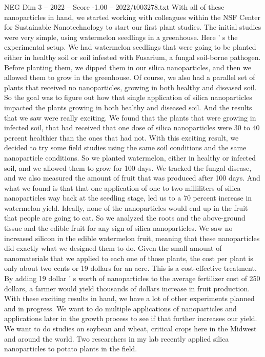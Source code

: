\begin{textsample}{NEG Dim 3 – 2022 – Score -1.00 – 2022/t003278.txt}
With all of these nanoparticles in hand, we started working with colleagues within the NSF Center for Sustainable Nanotechnology to start our first plant studies.
The initial studies were very simple, using watermelon seedlings in a greenhouse.
Here ' s the experimental setup.
We had watermelon seedlings that were going to be planted either in healthy soil or soil infested with Fusarium, a fungal soil-borne pathogen.
Before planting them, we dipped them in our silica nanoparticles, and then we allowed them to grow in the greenhouse.
Of course, we also had a parallel set of plants that received no nanoparticles, growing in both healthy and diseased soil.
So the goal was to figure out how that single application of silica nanoparticles impacted the plants growing in both healthy and diseased soil.
And the results that we saw were really exciting.
We found that the plants that were growing in infected soil, that had received that one dose of silica nanoparticles were 30 to 40 percent healthier than the ones that had not.
With this exciting result, we decided to try some field studies using the same soil conditions and the same nanoparticle conditions.
So we planted watermelon, either in healthy or infected soil, and we allowed them to grow for 100 days.
We tracked the fungal disease, and we also measured the amount of fruit that was produced after 100 days.
And what we found is that that one application of one to two milliliters of silica nanoparticles way back at the seedling stage, led us to a 70 percent increase in watermelon yield.
Ideally, none of the nanoparticles would end up in the fruit that people are going to eat.
So we analyzed the roots and the above-ground tissue and the edible fruit for any sign of silica nanoparticles.
We saw no increased silicon in the edible watermelon fruit, meaning that these nanoparticles did exactly what we designed them to do.
Given the small amount of nanomaterials that we applied to each one of those plants, the cost per plant is only about two cents or 19 dollars for an acre.
This is a cost-effective treatment.
By adding 19 dollar ' s worth of nanoparticles to the average fertilizer cost of 250 dollars, a farmer would yield thousands of dollars increase in fruit production.
With these exciting results in hand, we have a lot of other experiments planned and in progress.
We want to do multiple applications of nanoparticles and applications later in the growth process to see if that further increases our yield.
We want to do studies on soybean and wheat, critical crops here in the Midwest and around the world.
Two researchers in my lab recently applied silica nanoparticles to potato plants in the field.

\end{textsample}
